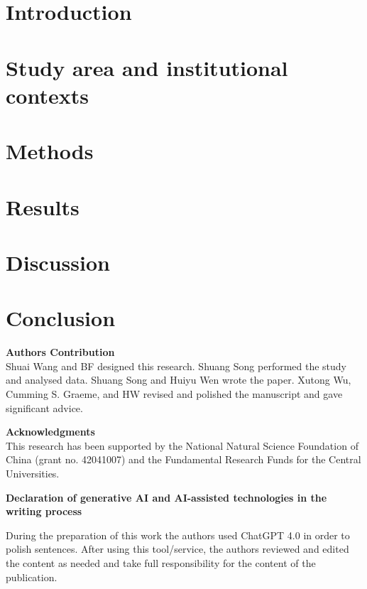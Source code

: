 \documentclass[preprint, 12pt]{elsarticle}
\begin{document}
\section{Introduction}\label{sec:introduction}


\section{Study area and institutional contexts}\label{sec:yrb}


\section{Methods}\label{sec:methods}


\section{Results}\label{sec:results}



\section{Discussion}\label{sec:discussion}


\section{Conclusion}\label{sec:conclusion}


\textbf{Authors Contribution}\\
Shuai Wang and BF designed this research. Shuang Song performed the study and analysed data. Shuang Song and Huiyu Wen wrote the paper. Xutong Wu, Cumming S. Graeme, and HW revised and polished the manuscript and gave significant advice.

\textbf{Acknowledgments}\\
This research has been supported by the National Natural Science Foundation of China (grant no. 42041007) and the Fundamental Research Funds for the Central Universities.

\textbf{Declaration of generative AI and AI-assisted technologies in the writing process}

During the preparation of this work the authors used ChatGPT 4.0 in order to polish sentences. After using this tool/service, the authors reviewed and edited the content as needed and take full responsibility for the content of the publication.
\end{document}
